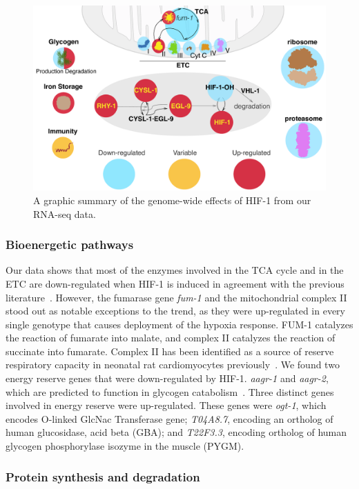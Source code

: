 \documentclass[9pt,twocolumn,twoside]{pnas-new}
\newcommand{\gene}[1]{\emph{#1}}
\newcommand{\hifp}{HIF-1}
\begin{document}
\begin{figure}[tbhp]
\centering
\includegraphics[width=\linewidth]{figs/hif1genomewide.pdf}
\caption{
A graphic summary of the genome-wide effects of \hifp{} from our RNA-seq data.
}
\label{fig:genomewide}
\end{figure}

\subsubsection*{Bioenergetic pathways}
Our data shows that most of the enzymes involved in the TCA cycle and in the ETC
are down-regulated when \hifp{} is induced in agreement with the previous
literature~\cite{Semenza2012}.
However, the fumarase gene \gene{fum-1} and the mitochondrial complex II stood out as notable
exceptions to the trend, as they were up-regulated in every single genotype that
causes deployment of the hypoxia response. FUM-1 catalyzes the reaction
of fumarate into malate, and complex II catalyzes the reaction of succinate into
fumarate. Complex II has been identified as a source of reserve respiratory
capacity in neonatal rat cardiomyocytes previously~\cite{Pfleger2015}.
We found two energy reserve genes that were down-regulated by \hifp{}.
\gene{aagr-1} and \gene{aagr-2}, which are predicted to function in glycogen
catabolism~\cite{Sikora2010}.
Three distinct genes involved in energy reserve were up-regulated. These genes were
\gene{ogt-1}, which encodes O-linked GlcNac Transferase gene; \gene{T04A8.7},
encoding an ortholog of human glucosidase, acid beta (GBA); and \gene{T22F3.3},
encoding ortholog of human glycogen phosphorylase isozyme in the muscle (PYGM).

\subsubsection*{Protein synthesis and degradation}
\end{document}
